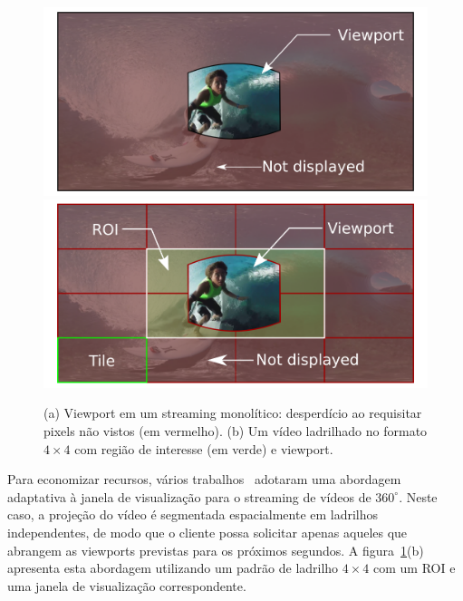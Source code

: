 \begin{figure}[htb]
\centering
\includegraphics[width=0.49\columnwidth]{fig/viewport1.png} \hfill
\includegraphics[width=0.49\columnwidth]{fig/viewport2.png} \\
\caption{(a) Viewport em um streaming monolítico: desperdício ao requisitar pixels não vistos (em vermelho). (b) Um vídeo ladrilhado no formato $4 \times 4$ com região de interesse (em verde) e viewport.}
\label{fig:viewport}
\end{figure}

Para economizar recursos, vários trabalhos~\cite{Zare2016, Graf2017, Hosseini2017, Xiao2018} adotaram uma abordagem adaptativa à janela de visualização para o streaming de vídeos de $360^\circ$. Neste caso, a projeção do vídeo é segmentada espacialmente em ladrilhos independentes, de modo que o cliente possa solicitar apenas aqueles que abrangem as viewports previstas para os próximos segundos. A figura~\ref{fig:viewport}(b) apresenta esta abordagem utilizando um padrão de ladrilho $4 \times 4$ com um ROI e uma janela de visualização correspondente.

